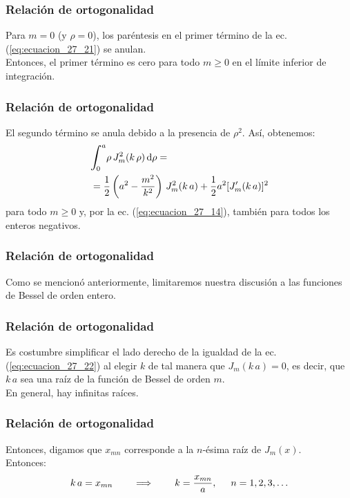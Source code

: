 \documentclass[12pt]{beamer}
\begin{document}
\begin{frame}
\frametitle{Relación de ortogonalidad}
Para $m = 0$ (y $\rho = 0$), los paréntesis en el primer término de la ec. (\ref{eq:ecuacion_27_21}) se anulan. 
\\
\bigskip
\pause
Entonces, el primer término es cero para todo $m \geq 0$ en el límite inferior de integración.
\end{frame}
\begin{frame}
\frametitle{Relación de ortogonalidad}
El segundo término se anula debido a la presencia de $\rho^{2}$. \pause Así, obtenemos:
\pause
\begin{equation}
\begin{aligned}[b]
&\scaleint{6ex}_{\bs 0}^{a} \rho \, J_{m}^{2} ( k \, \rho) \dd{\rho} = \\
&= \dfrac{1}{2} \left( a^{2} - \dfrac{m^{2}}{k^{2}} \right) \, J_{m}^{2} (k \, a) + \dfrac{1}{2} a^{2} [\pderivada{J}_{m} (k \, a)]^{2}
\end{aligned}
\label{eq:ecuacion_27_22}
\end{equation}
\pause
para todo $m \geq 0$ y, por la ec. (\ref{eq:ecuacion_27_14}), también para todos los enteros negativos.
\end{frame}
\begin{frame}
\frametitle{Relación de ortogonalidad}
Como se mencionó anteriormente, limitaremos nuestra discusión a las funciones de Bessel de orden entero.
\end{frame}
\begin{frame}
\frametitle{Relación de ortogonalidad}
Es costumbre simplificar el lado derecho de la igualdad de la ec. (\ref{eq:ecuacion_27_22}) al elegir $k$ de tal manera que $J_{m} (k \, a) = 0$, es decir, que $k \, a$ sea una raíz de la función de Bessel de orden $m$. 
\\
\bigskip
\pause
En general, hay infinitas raíces.
\end{frame}
\begin{frame}
\frametitle{Relación de ortogonalidad}
Entonces, digamos que $x_{mn}$ corresponde a la $n$-ésima raíz de $J_m (x)$.
\\
\bigskip
\pause
Entonces:
\pause
\begin{align*}
k \, a = x_{mn} \hspace{0.75cm} \Longrightarrow \hspace{0.75cm} k = \dfrac{x_{mn}}{a}, \hspace{0.5cm} n = 1, 2, 3, \ldots
\end{align*}
\end{frame}
\end{document}
